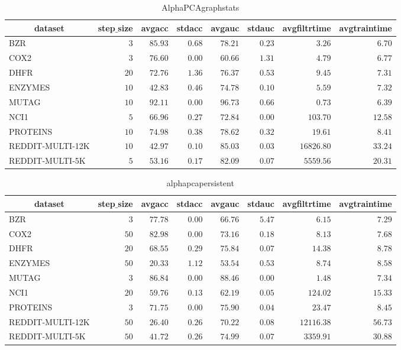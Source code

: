 \documentclass[]{article}
\begin{document}
\begin{table}[!tbp]
\caption{AlphaPCAgraphstats\label{AlphaPCAgraphstats}} 
{\centering
\begin{tabular}{lrrrrrrr}
\hline\hline
\multicolumn{1}{c}{dataset}&\multicolumn{1}{c}{step$\_$size}&\multicolumn{1}{c}{avgacc}&\multicolumn{1}{c}{stdacc}&\multicolumn{1}{c}{avgauc}&\multicolumn{1}{c}{stdauc}&\multicolumn{1}{c}{avgfiltrtime}&\multicolumn{1}{c}{avgtraintime}\tabularnewline
\hline
BZR&$ 3$&$85.93$&$0.68$&$78.21$&$0.23$&$    3.26$&$ 6.70$\tabularnewline
COX2&$ 3$&$76.60$&$0.00$&$60.66$&$1.31$&$    4.79$&$ 6.77$\tabularnewline
DHFR&$20$&$72.76$&$1.36$&$76.37$&$0.53$&$    9.45$&$ 7.31$\tabularnewline
ENZYMES&$10$&$42.83$&$0.46$&$74.78$&$0.10$&$    5.59$&$ 7.32$\tabularnewline
MUTAG&$10$&$92.11$&$0.00$&$96.73$&$0.66$&$    0.73$&$ 6.39$\tabularnewline
NCI1&$ 5$&$66.96$&$0.27$&$72.84$&$0.00$&$  103.70$&$12.58$\tabularnewline
PROTEINS&$10$&$74.98$&$0.38$&$78.62$&$0.32$&$   19.61$&$ 8.41$\tabularnewline
REDDIT-MULTI-12K&$10$&$42.97$&$0.10$&$85.03$&$0.03$&$16826.80$&$33.24$\tabularnewline
REDDIT-MULTI-5K&$ 5$&$53.16$&$0.17$&$82.09$&$0.07$&$ 5559.56$&$20.31$\tabularnewline
\hline
\end{tabular}}
\end{table}
\begin{table}[!tbp]
\caption{alphapcapersistent\label{alphapcapersistent}} 
{\centering
\begin{tabular}{lrrrrrrr}
\hline\hline
\multicolumn{1}{c}{dataset}&\multicolumn{1}{c}{step$\_$size}&\multicolumn{1}{c}{avgacc}&\multicolumn{1}{c}{stdacc}&\multicolumn{1}{c}{avgauc}&\multicolumn{1}{c}{stdauc}&\multicolumn{1}{c}{avgfiltrtime}&\multicolumn{1}{c}{avgtraintime}\tabularnewline
\hline
BZR&$ 3$&$77.78$&$0.00$&$66.76$&$5.47$&$    6.15$&$ 7.29$\tabularnewline
COX2&$50$&$82.98$&$0.00$&$73.16$&$0.18$&$    8.13$&$ 7.68$\tabularnewline
DHFR&$20$&$68.55$&$0.29$&$75.84$&$0.07$&$   14.38$&$ 8.78$\tabularnewline
ENZYMES&$50$&$20.33$&$1.12$&$53.54$&$0.53$&$    8.74$&$ 8.58$\tabularnewline
MUTAG&$ 3$&$86.84$&$0.00$&$88.46$&$0.00$&$    1.48$&$ 7.34$\tabularnewline
NCI1&$20$&$59.76$&$0.13$&$62.19$&$0.05$&$  124.02$&$15.33$\tabularnewline
PROTEINS&$ 3$&$71.75$&$0.00$&$75.90$&$0.04$&$   23.47$&$ 8.45$\tabularnewline
REDDIT-MULTI-12K&$50$&$26.40$&$0.26$&$70.22$&$0.08$&$12116.38$&$56.73$\tabularnewline
REDDIT-MULTI-5K&$50$&$41.72$&$0.26$&$74.99$&$0.07$&$ 3359.91$&$30.88$\tabularnewline
\hline
\end{tabular}}
\end{table}
\end{document}
